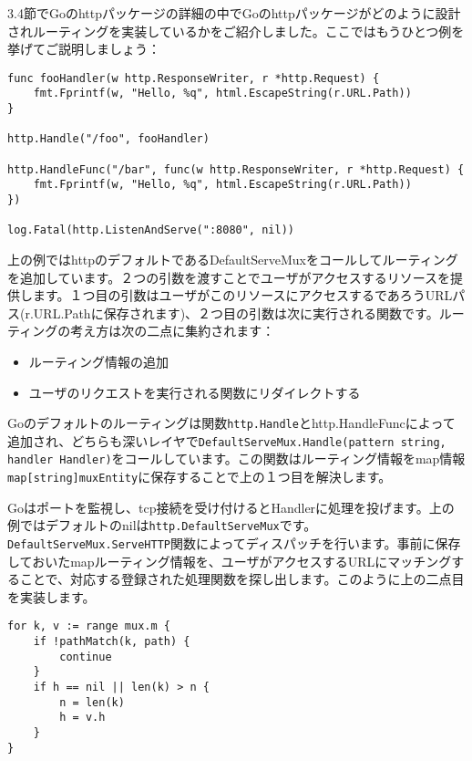 3.4節でGoのhttpパッケージの詳細の中でGoのhttpパッケージがどのように設計されルーティングを実装しているかをご紹介しました。ここではもうひとつ例を挙げてご説明しましょう：

\begin{lstlisting}[numbers=none]
func fooHandler(w http.ResponseWriter, r *http.Request) {
    fmt.Fprintf(w, "Hello, %q", html.EscapeString(r.URL.Path))
}

http.Handle("/foo", fooHandler)

http.HandleFunc("/bar", func(w http.ResponseWriter, r *http.Request) {
    fmt.Fprintf(w, "Hello, %q", html.EscapeString(r.URL.Path))
})

log.Fatal(http.ListenAndServe(":8080", nil))
\end{lstlisting}

上の例ではhttpのデフォルトであるDefaultServeMuxをコールしてルーティングを追加しています。２つの引数を渡すことでユーザがアクセスするリソースを提供します。１つ目の引数はユーザがこのリソースにアクセスするであろうURLパス(r.URL.Pathに保存されます)、２つ目の引数は次に実行される関数です。ルーティングの考え方は次の二点に集約されます：

\begin{itemize}
  \item ルーティング情報の追加
  \item ユーザのリクエストを実行される関数にリダイレクトする
\end{itemize}

Goのデフォルトのルーティングは関数\texttt{http.Handle}とhttp.HandleFuncによって追加され、どちらも深いレイヤで\texttt{DefaultServeMux.Handle(pattern string, handler Handler)}をコールしています。この関数はルーティング情報をmap情報\texttt{map[string]muxEntity}に保存することで上の１つ目を解決します。

Goはポートを監視し、tcp接続を受け付けるとHandlerに処理を投げます。上の例ではデフォルトのnilは\texttt{http.DefaultServeMux}です。\texttt{DefaultServeMux.ServeHTTP}関数によってディスパッチを行います。事前に保存しておいたmapルーティング情報を、ユーザがアクセスするURLにマッチングすることで、対応する登録された処理関数を探し出します。このように上の二点目を実装します。


\begin{lstlisting}[numbers=none]
for k, v := range mux.m {
    if !pathMatch(k, path) {
        continue
    }
    if h == nil || len(k) > n {
        n = len(k)
        h = v.h
    }
}
\end{lstlisting}


